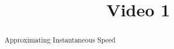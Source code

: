 \documentclass[handout]{ximera}
\title{Video 1}
\begin{document}
\begin{abstract}
Approximating Instantaneous Speed
\end{abstract}

\maketitle

\end{document}
